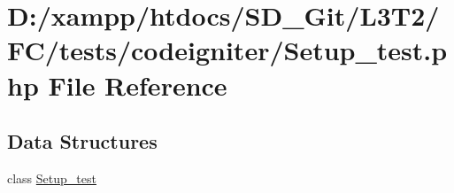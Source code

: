 \hypertarget{_setup__test_8php}{}\section{D\+:/xampp/htdocs/\+S\+D\+\_\+\+Git/\+L3\+T2/\+F\+C/tests/codeigniter/\+Setup\+\_\+test.php File Reference}
\label{_setup__test_8php}
\subsection*{Data Structures}
\begin{DoxyCompactItemize}
\item 
class \hyperlink{class_setup__test}{Setup\+\_\+test}
\end{DoxyCompactItemize}
